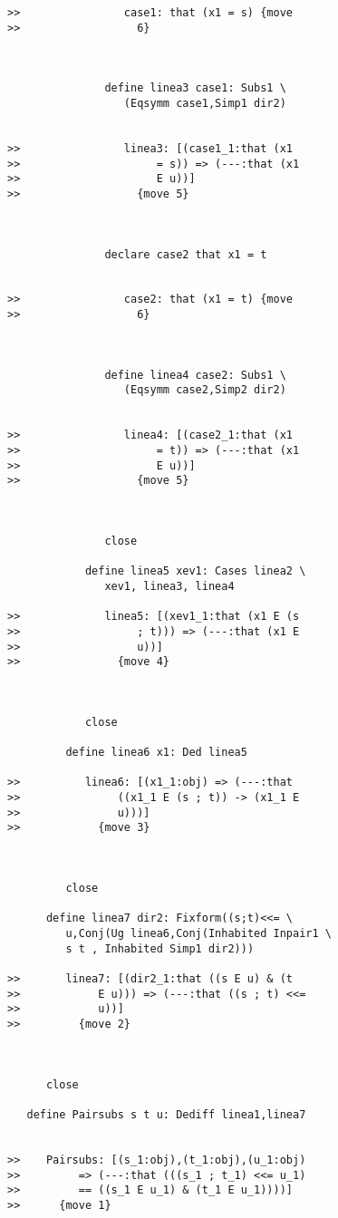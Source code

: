 \documentclass[12pt]{article}
\begin{document}
\begin{verbatim}
>>                case1: that (x1 = s) {move
>>                  6}



               define linea3 case1: Subs1 \
                  (Eqsymm case1,Simp1 dir2)


>>                linea3: [(case1_1:that (x1
>>                     = s)) => (---:that (x1
>>                     E u))]
>>                  {move 5}



               declare case2 that x1 = t


>>                case2: that (x1 = t) {move
>>                  6}



               define linea4 case2: Subs1 \
                  (Eqsymm case2,Simp2 dir2)


>>                linea4: [(case2_1:that (x1
>>                     = t)) => (---:that (x1
>>                     E u))]
>>                  {move 5}



               close

            define linea5 xev1: Cases linea2 \
               xev1, linea3, linea4

>>             linea5: [(xev1_1:that (x1 E (s
>>                  ; t))) => (---:that (x1 E
>>                  u))]
>>               {move 4}



            close

         define linea6 x1: Ded linea5

>>          linea6: [(x1_1:obj) => (---:that
>>               ((x1_1 E (s ; t)) -> (x1_1 E
>>               u)))]
>>            {move 3}



         close

      define linea7 dir2: Fixform((s;t)<<= \
         u,Conj(Ug linea6,Conj(Inhabited Inpair1 \
         s t , Inhabited Simp1 dir2)))

>>       linea7: [(dir2_1:that ((s E u) & (t
>>            E u))) => (---:that ((s ; t) <<=
>>            u))]
>>         {move 2}



      close

   define Pairsubs s t u: Dediff linea1,linea7


>>    Pairsubs: [(s_1:obj),(t_1:obj),(u_1:obj)
>>         => (---:that (((s_1 ; t_1) <<= u_1)
>>         == ((s_1 E u_1) & (t_1 E u_1))))]
>>      {move 1}




\end{verbatim}
\end{document}

